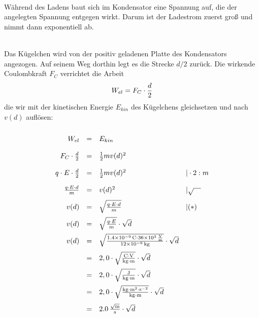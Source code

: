 \documentclass[a4paper]{article}
\begin{document}
\vspace{0.5 cm}


\\
Während des Ladens baut sich im Kondensator eine Spannung auf, die der angelegten Spannung entgegen wirkt. Darum ist der Ladestrom zuerst groß und nimmt dann exponentiell ab.
\vspace{0.5 cm}

\\
Das Kügelchen wird von der positiv geladenen Platte des Kondensators angezogen. Auf seinem Weg dorthin legt es die Strecke $d/2$ zurück. Die wirkende Coulombkraft $F_C$ verrichtet die Arbeit 
$$W_{el} = F_C \cdot {d \over 2}$$ die wir mit der kinetischen Energie $E_{kin}$ des Kügelchens gleichsetzen und nach $v(d)$ auflösen:

$$
\renewcommand{\arraystretch}{2}
\begin{array}{rcll}
W_{el} & = & E_{kin} \\
F_C \cdot {d \over 2} & = & {1 \over 2}m v(d)^2 \\
q \cdot E \cdot {d \over 2} & = & {1 \over 2}m v(d)^2 & | \cdot 2 : m \\
{q \cdot E \cdot d \over m} & = & v(d)^2 & | \sqrt{\quad}\\
v(d) & = & \sqrt{q \cdot E \cdot d \over m} &|(*) \\
v(d) & = & \sqrt{q \cdot E \over m} \cdot \sqrt{d} \\
v(d) & = & \sqrt{\SI{1,4e-9}{\coulomb} \cdot \SI{36e3}{\volt\over \meter}\over \SI{12e-6}{\kilogram}}  \cdot \sqrt{d}\\ 
 & = & 2,0 \cdot \sqrt{\SI{}{\coulomb \cdot \volt \over \kilogram \cdot \meter}}  \cdot \sqrt{d} \\
 & = & 2,0 \cdot \sqrt{ \SI{}{\joule \over \kilogram \cdot \meter}}  \cdot \sqrt{d}\\
 & = & 2,0  \cdot \sqrt{\SI{}{{\kilogram \cdot \meter^2 \cdot \second^{-2}} \over {\kilogram \cdot \meter}}} \cdot \sqrt{d}\\
 & = & \SI{2,0}{\sqrt{\meter}\over \second} \cdot \sqrt{d}
\end{array}
$$
\vspace{0.5 cm}
\end{document}
